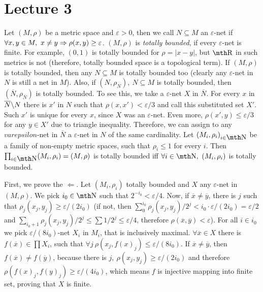\chapter{Lecture 3}

 Let $(M,\rho)$ be a metric space and 
$\varepsilon>0$, then we call $N\subseteq M$ an $\varepsilon$-net 
if $\forall x,y \in M,\ x\neq y \Rightarrow \rho(x,y) \geq \varepsilon$. 
$(M,\rho)$ is {\it totally bounded}, if every $\varepsilon$-net 
is finite. For example, $(0,1)$ is totally bounded for $\rho=|x-y|$,
but $\R$ in such metrics is not (therefore, totally bounded space 
is a topological term).
\smallskip
If $(M,\rho)$ is totally bounded, then any $N\subseteq M$ is totally 
bounded too (clearly any $\varepsilon$-net in $N$ is still a net in 
$M$). Also, if $(N,\rho_{N}),\ N\subseteq M$ is totally bounded,
then $(\overline N,\rho_{\overline N})$ is totally bounded. To see 
this, we take a $\varepsilon$-net $X$ in $\overline N$. For every 
$x$ in $\overline N \backslash N$ there is $x'$ in $N$ such that $\rho(x,x')
< \varepsilon/3$ and call this substituted set $X'$. Such $x'$ is 
unique for every $x$, since $X$ was an $\varepsilon$-net. Even 
more, $\rho(x',y)\leq \varepsilon/3$ for any $y\in X'$ due to triangle 
inequality. Therefore, we can assign to any $varepsilon$-net in 
$\overline N$ a $\varepsilon$-net in $N$ of the same cardinality.
\smallskip
Let $(M_i,\rho_i)_{i\in \N}$ be a family of non-empty metric spaces,
such that $\rho_i \leq 1$ for every $i$. Then $\prod_{i\in \N} 
(M_i,\rho_i) = (M,\rho)$ is totally bounded iff $\forall i\in \N,\ 
(M_i,\rho_i)$ is totally bounded.

First, we prove the $\Leftarrow$. Let $(M_i,\rho_i)$ totally bounded 
and $X$ any $\varepsilon$-net in $(M,\rho)$. We pick $i_0\in \N$ 
such that $2^{-i_0} < \varepsilon/4$. Now, if $\overline x \neq 
\overline y$, there is $j$ such that $\rho_j(x_j,y_j) \geq 
\varepsilon / (2i_0)$ (if not, then $\sum_0^{i_0} \rho_j(x_j,y_j)/
2^{j} < i_0 \cdot \varepsilon/(2i_0) = \varepsilon/2$ and 
$\sum_{i_0 +1} \rho_j(x_j,y_j) / 2^j \leq \sum 1/2^j \leq 
\varepsilon/4$, therefore $\rho(\overline x, \overline y) < 
\varepsilon$). For all $i\in i_0$ we pick $\varepsilon/(8i_0)$-net
$X_i$ in $M_i$, that is inclusively maximal. $\forall \overline x 
\in X$ there is $f(\overline x)\in \prod X_i$, such that $\forall j\ 
\rho(x_j, f(x)_j) \leq \varepsilon/(8i_0)$. 
If $\overline x\neq \overline y$, then $f(\overline x) \neq f(\overline 
y)$, because 
there is $j,\ \rho(x_j,y_j)\geq \varepsilon /(2i_0)$ and therefore 
$\rho(f(x)_j,f(y)_j) \geq \varepsilon /(4i_0)$, which means
$f$ is injective mapping into finite set, proving that $X$ is 
finite.

